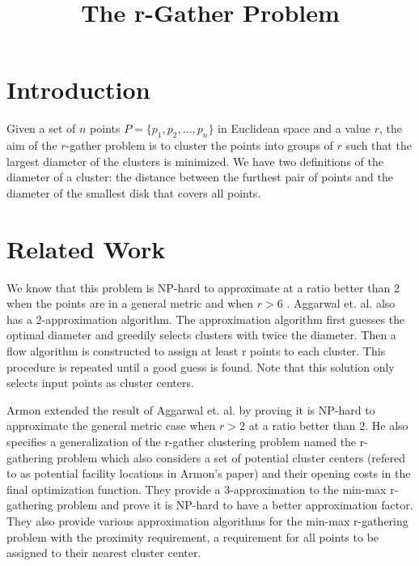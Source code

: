 \documentclass[11pt]{article}
\title{The r-Gather Problem}
\author{}
\begin{document}
\maketitle

\begin{abstract}

\end{abstract}

\section{Introduction}
Given a set of $n$ points $P = \{p_1, p_2, \dots, p_n\}$ in Euclidean space and a value $r$, the aim of the $r$-gather problem is to cluster the points into groups of $r$ such that the largest diameter of the clusters is minimized. We have two definitions of the diameter of a cluster: the distance between the furthest pair of points and the diameter of the smallest disk that covers all points.

\section{Related Work}
We know that this problem is NP-hard to approximate at a ratio better than 2 when the points are in a general metric and when $r > 6$ \cite{Aggarwal06achievinganonymity}.  Aggarwal et. al. also has a 2-approximation algorithm.  The approximation algorithm first guesses the optimal diameter and greedily selects clusters with twice the diameter.  Then a flow algorithm is constructed to assign at least r points to each cluster.  This procedure is repeated until a good guess is found.  Note that this solution only selects input points as cluster centers.

Armon \cite{Armon} extended the result of Aggarwal et. al. by proving it is NP-hard to approximate the general metric case when $r > 2$ at a ratio better than 2.  He also specifies a generalization of the r-gather clustering problem named the r-gathering problem which also considers a set of potential cluster centers (refered to as potential facility locations in Armon's paper) and their opening costs in the final optimization function. They provide a 3-approximation to the min-max r-gathering problem and prove it is NP-hard to have a better approximation factor.  They also provide various approximation algorithms for the min-max r-gathering problem with the proximity requirement, a requirement for all points to be assigned to their nearest cluster center.
\end{document}
